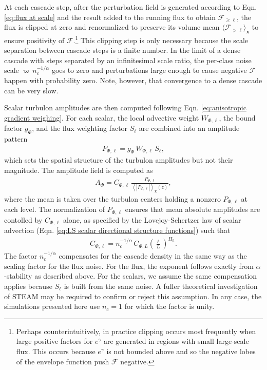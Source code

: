 \documentclass[acp, manuscript, english]{copernicus}
\begin{document}
At each cascade step, after the perturbation field is generated according to Eqn. \ref{eq:flux at scale} and the result added to the running flux to obtain $\mathcal{F}_{\ge \ell}$, the flux is clipped at zero and renormalized to preserve its volume mean $\langle\mathcal{F}_{>\ell}\rangle_\mathbf{x}$ to ensure positivity of $\mathcal{F}$.\footnote{Perhaps counterintuitively, in practice clipping occurs most frequently when large positive factors for $e^\gamma$ are generated in regions with small large-scale flux. This occurs because $e^\gamma$ is not bounded above and so the negative lobes of the envelope function push $\mathcal{F}$ negative.} This clipping step is only necessary because the scale separation between cascade steps is a finite number. In the limit of a dense cascade with steps separated by an infinitesimal scale ratio, the per-class noise scale $\varpi\, n_c^{-1/\alpha}$ goes to zero and perturbations large enough to cause negative $\mathcal{F}$ happen with probability zero. Note, however, that convergence to a dense cascade can be very slow.

Scalar turbulon amplitudes are then computed following Eqn. \ref{eq:anisotropic gradient weighing}. For each scalar, the local advective weight $W_{\Phi,\ell}$, the bound factor $g_\Phi$, and the flux weighting factor $S_\ell$ are combined into an amplitude pattern
\begin{align}
  P_{\Phi,\ell} = g_\Phi\, W_{\Phi,\ell}\, S_\ell, \label{apxeq:amplitude pattern}
\end{align}
which sets the spatial structure of the turbulon amplitudes but not their magnitude. The amplitude field is computed as
\begin{align}
  A_\Phi = C_{\Phi, \ell}\, \frac{P_{\Phi,\ell}}{\left\langle \left|P_{\Phi,\ell}\right| \right\rangle_\mathbf{x}(z)},
  \label{apxeq:amplitude propto gradient normalized}
\end{align}
where the mean is taken over the turbulon centers holding a nonzero $P_{\Phi, \ell}$ at each level. The normalization of $P_{\Phi, \ell}$ ensures that mean absolute amplitudes are contolled by $C_{\Phi,\ell}$ alone, as specified by the Lovejoy-Schertzer law of scalar advection (Eqn. \ref{eq:LS scalar directional structure functions}) such that
\begin{align}
    C_{\Phi, \ell} = n_c^{-1/\alpha}\, C_{\Phi, L}\left(\frac{\ell}{L}\right)^{H_h}.\label{apxeq:mean turbulon amplitude}
\end{align}
The factor $n_c^{-1/\alpha}$ compensates for the cascade density in the same way as the scaling factor for the flux noise. For the flux, the exponent follows exactly from $\alpha$-stability as described above. For the scalars, we assume the same compensation applies because $S_\ell$ is built from the same noise. A fuller theoretical investigation of STEAM may be required to confirm or reject this assumption. In any case, the simulations presented here use $n_c = 1$ for which the factor is unity.
\end{document}
